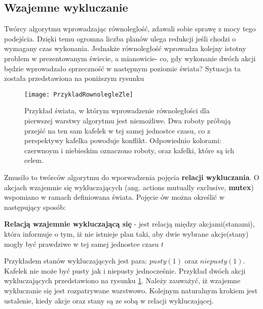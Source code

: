     \subsection{Wzajemne wykluczanie}
    Twórcy algorytmu wprowadzając równoleglość, zdawali sobie sprawę z mocy tego podejścia. Dzięki temu ogromna liczba planów ulega redukcji
    jeśli chodzi o wymagany czas wykonania. Jednakże równoległość wprowadza kolejny istotny problem w prezentowanym świecie, a mianowicie- co, gdy
    wykonanie dwóch akcji będzie wprowadzało sprzeczność w następnym poziomie świata? Sytuacja ta została przedstawiona na poniższym rysunku
    \begin{figure}[H]
        \texttt{[image: PrzykladRownolegleZle]}
        \centering
        \caption{Przykład świata, w którym wprowadzenie równoległości dla pierwszej warstwy algorytmu jest niemożliwe. 
        Dwa roboty próbują przejść na ten sam kafelek
        w tej samej jednostce czasu, co z perspektywy kafelka powoduje konflikt. Odpowiednio kolorami:
        czerwnoym i niebieskim oznaczono roboty, oraz kafelki, które są ich celem.}
        \label{PrzykladRownolegle}
    \end{figure}
    
    Zmusiło to twórców algorytmu do wporwadzenia pojęcia \textbf{relacji wykluczania}. 
    O akcjach wzajemnie się wykluczających (ang. actions mutually exclusive, \textbf{mutex}) wspomiano w ramach definiowana świata. Pojęcie ów można 
    określić w następujący sposób:
    \begin{definition}
        \label{Warstwa}
        \textbf{Relacją wzajemnie wykluczającą się} - jest relacją między akcjami(stanami), która informuje o tym, iż nie istnieje plan taki,
        aby dwie wybrane akcje(stany) mogły być prawdziwe w tej samej jednostce czasu $t$
    \end{definition}
    Przykładem stanów wykluczających jest para: $pusty(1)$ oraz $niepusty(1)$. Kafelek nie może być pusty jak i niepusty jednocześnie.
    Przykład dwóch akcji wykluczających przedstawiono na rysunku \ref{PrzykladRownolegle}. Należy zauważyć, iż wzajemne wykluczanie się 
    jest rozpatrywane warstwowo.
    Kolejnym naturalnym krokiem jest ustalenie, kiedy akcje oraz stany są ze sobą w relacji wykluczającej. 

